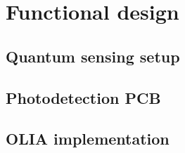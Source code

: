 \chapter{Functional design} \label{chap:func_design}
\section{Quantum sensing setup}
\section{Photodetection PCB}
\section{OLIA implementation}
